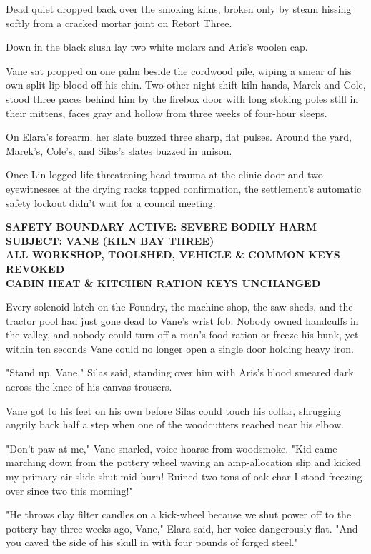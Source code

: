 Dead quiet dropped back over the smoking kilns, broken only by steam hissing softly from a cracked mortar joint on Retort Three.

Down in the black slush lay two white molars and Aris's woolen cap.

Vane sat propped on one palm beside the cordwood pile, wiping a smear of his own split-lip blood off his chin. Two other night-shift kiln hands, Marek and Cole, stood three paces behind him by the firebox door with long stoking poles still in their mittens, faces gray and hollow from three weeks of four-hour sleeps.

On Elara's forearm, her slate buzzed three sharp, flat pulses. Around the yard, Marek's, Cole's, and Silas's slates buzzed in unison.

Once Lin logged life-threatening head trauma at the clinic door and two eyewitnesses at the drying racks tapped confirmation, the settlement's automatic safety lockout didn't wait for a council meeting:

\begin{center}
\textbf{SAFETY BOUNDARY ACTIVE: SEVERE BODILY HARM}\\
\textbf{SUBJECT: VANE (KILN BAY THREE)}\\
\textbf{ALL WORKSHOP, TOOLSHED, VEHICLE \& COMMON KEYS REVOKED}\\
\textbf{CABIN HEAT \& KITCHEN RATION KEYS UNCHANGED}
\end{center}

Every solenoid latch on the Foundry, the machine shop, the saw sheds, and the tractor pool had just gone dead to Vane's wrist fob. Nobody owned handcuffs in the valley, and nobody could turn off a man's food ration or freeze his bunk, yet within ten seconds Vane could no longer open a single door holding heavy iron.

"Stand up, Vane," Silas said, standing over him with Aris's blood smeared dark across the knee of his canvas trousers.

Vane got to his feet on his own before Silas could touch his collar, shrugging angrily back half a step when one of the woodcutters reached near his elbow.

"Don't paw at me," Vane snarled, voice hoarse from woodsmoke. "Kid came marching down from the pottery wheel waving an amp-allocation slip and kicked my primary air slide shut mid-burn! Ruined two tons of oak char I stood freezing over since two this morning!"

"He throws clay filter candles on a kick-wheel because we shut power off to the pottery bay three weeks ago, Vane," Elara said, her voice dangerously flat. "And you caved the side of his skull in with four pounds of forged steel."

